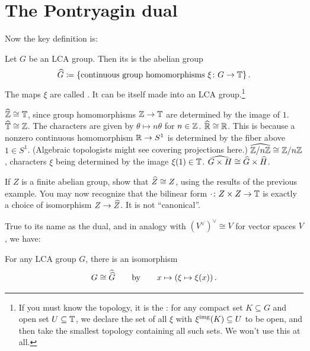 \section{The Pontryagin dual}
Now the key definition is:
\begin{definition}
	Let $G$ be an LCA group.
	Then its  is the abelian group
	\[ \widehat G \coloneqq \left\{ \text{continuous group homomorphisms }
			\xi \colon G \to \mathbb T \right\}. \]
	The maps $\xi$ are called .
	It can be itself made into an LCA group.\footnote{If you must
		know the topology, it is the :
		for any compact set $K \subseteq G$ and open set $U \subseteq \mathbb T$,
		we declare the set of all $\xi$ with $\xi^{\text{img}}(K) \subseteq U$ to be open,
		and then take the smallest topology containing all such sets.
		We won't use this at all.}
\end{definition}
\begin{example}
	\listhack
	\begin{itemize}
		\ii $\widehat{\mathbb Z} \cong \mathbb T$,
		since group homomorphisms $\mathbb Z \to \mathbb T$ are determined by the image of $1$.
		\ii $\widehat{\mathbb T} \cong \mathbb Z$.
		The characters are given by $\theta \mapsto n\theta$ for $n \in \mathbb Z$.
		\ii $\widehat{\mathbb R} \cong \mathbb R$.
		This is because a nonzero continuous homomorphism
		$\mathbb R \to S^1$ is determined by the fiber above $1 \in S^1$.
		(Algebraic topologists might see covering projections here.)
		\ii $\widehat{\mathbb Z/n\mathbb Z} \cong \mathbb Z/n\mathbb Z$,
		characters $\xi$ being determined by the image $\xi(1) \in \mathbb T$.
		\ii $\widehat{G \times H} \cong \widehat G \times \widehat H$.
	\end{itemize}
\end{example}
\begin{exercise}
	If $Z$ is a finite abelian group, show that $\widehat Z \cong Z$,
	using the results of the previous example.
	You may now recognize that the bilinear form
	$\cdot \colon Z \times Z \to \mathbb T$
	is exactly a choice of isomorphism $Z \to \widehat Z$.
	It is not ``canonical''.
\end{exercise}

True to its name as the dual,
and in analogy with $(V^\vee)^\vee \cong V$ for vector spaces $V$, we have:
\begin{theorem}
	For any LCA group $G$, there is an isomorphism
	\[ G \cong \widehat{\widehat G} \qquad \text{by} \qquad
		x \mapsto \left( \xi \mapsto \xi(x) \right). \]
\end{theorem}


